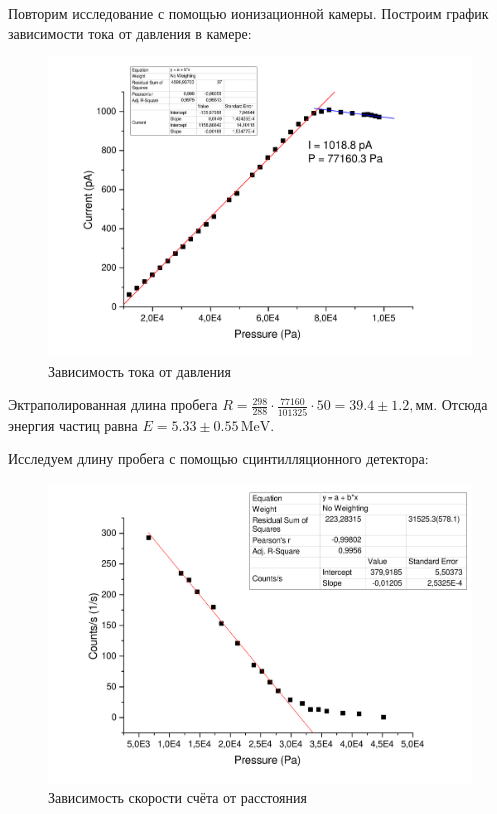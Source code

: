 \documentclass[a4paper,12pt]{article}
\begin{document}
        Повторим исследование с помощью ионизационной камеры. Построим график зависимости тока от давления в камере:
        \pagebreak
        \begin{figure}[h!]
        \centering
        \includegraphics[width=\textwidth]{ioncam}
        \caption{Зависимость тока от давления }
    \end{figure}
    
    Эктраполированная длина пробега $R = \frac{298}{288}\cdot\frac{77160}{101325}\cdot50 = 39.4\pm 1.2,\textit{мм}$. Отсюда энергия частиц равна $E = 5.33\pm 0.55\,\mathrm{MeV}$.
    
    Исследуем длину пробега с помощью сцинтилляционного детектора:
    \begin{figure}[h!]
        \centering
        \includegraphics[width=\textwidth]{scint.pdf}
        \caption{Зависимость скорости счёта от расстояния}
    \end{figure}
    
\end{document}
